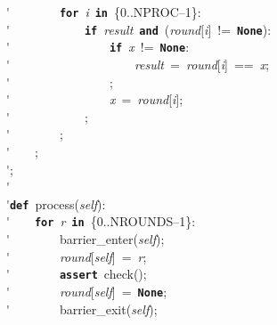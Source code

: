 \'\>~~~~~~~~\texttt{\textbf{for}}~\textit{i}~\texttt{\textbf{in}}~\{0..NPROC--1\}:\\

\'\>~~~~~~~~~~~~\texttt{\textbf{if}}~\textit{result}~\texttt{\textbf{and}}~(\textit{round}[\textit{i}]~!=~\texttt{\textbf{None}}):\\

\'\>~~~~~~~~~~~~~~~~\texttt{\textbf{if}}~\textit{x}~!=~\texttt{\textbf{None}}:\\

\'\>~~~~~~~~~~~~~~~~~~~~\textit{result}~=~\textit{round}[\textit{i}]~==~\textit{x};\\

\'\>~~~~~~~~~~~~~~~~;\\

\'\>~~~~~~~~~~~~~~~~\textit{x}~=~\textit{round}[\textit{i}];\\

\'\>~~~~~~~~~~~~;\\

\'\>~~~~~~~~;\\

\'\>~~~~;\\

\'\>;\\

\'\>\\

\'\>\texttt{\textbf{def}}~process(\textit{self}):\\

\'\>~~~~\texttt{\textbf{for}}~\textit{r}~\texttt{\textbf{in}}~\{0..NROUNDS--1\}:\\

\'\>~~~~~~~~barrier\_enter(\textit{self});\\

\'\>~~~~~~~~\textit{round}[\textit{self}]~=~\textit{r};\\

\'\>~~~~~~~~\texttt{\textbf{assert}}~check();\\

\'\>~~~~~~~~\textit{round}[\textit{self}]~=~\texttt{\textbf{None}};\\

\'\>~~~~~~~~barrier\_exit(\textit{self});\\

